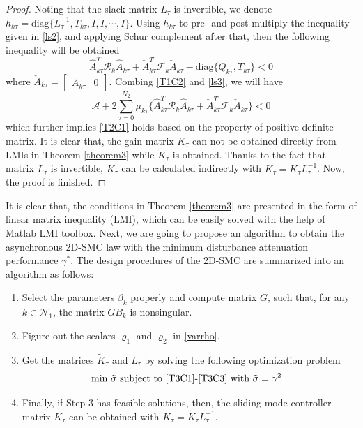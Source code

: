 \documentclass[journal,final,twocolumn]{IEEEtran}
\begin{document}
\begin{proof}
	 Noting that the slack matrix $L_{\tau }$ is invertible, we denote $h_{k\tau }= \mathrm{diag}\{L^{-1}_{\tau }, T_{k\tau }, I, I,\cdots, I \}$. Using $h_{k\tau }$ to  pre- and post-multiply the inequality given in \eqref{ls2}, and applying Schur complement after that, then the following inequality will be obtained
	 \begin{equation} \label{ls3}
	 	\hat{A}^{T}_{k\tau }\mathcal{R}_{k}\hat{A}_{k\tau } + \check{A}^{T}_{k\tau }\mathcal{F}_{k}\check{A}_{k\tau }  - \mathrm{diag}\{Q_{k\tau }, T_{k\tau }\} < 0  
	 \end{equation}
	 where $\check{A}_{k\tau }=\begin{bmatrix}
	 \bar{A}_{k\tau }&0
	 \end{bmatrix}$. Combing \eqref{T1C2} and \eqref{ls3},  we will have
	 \begin{equation}
	 	\mathcal{A} +2\sum_{\tau =0}^{N_{2}}\mu_{k\tau }\Big\{ \hat{A}^{T}_{k\tau }\mathcal{R}_{k}\hat{A}_{k\tau } + \check{A}^{T}_{k\tau }\mathcal{F}_{k}\check{A}_{k\tau } \Big\} < 0
	 \end{equation}
	 which further implies \eqref{T2C1} holds based on the property of positive definite matrix. It is clear that, the gain matrix $K_{\tau }$ can not be obtained directly from LMIs in Theorem \ref{theorem3} while $\tilde{K}_{\tau }$ is obtained. Thanks  to the fact that matrix $L_{\tau }$ is invertible, $K_{\tau }$ can be calculated indirectly with $K_{\tau }=\tilde{K}_{\tau }L^{-1}_{\tau }$. Now, the proof is finished.
\end{proof}


	It is clear that, the conditions in Theorem \ref{theorem3} are presented in the form of linear matrix inequality (LMI), which can be easily solved with the help of Matlab LMI toolbox. Next, we are going to propose an algorithm to obtain the asynchronous 2D-SMC law with the minimum disturbance attenuation performance $\gamma^{*}$. The design procedures of the 2D-SMC are summarized into an algorithm as follows:
	\begin{enumerate}
		\item Select the parameters $\beta_{k}$ properly and compute matrix $G$, such that, for any $k\in\mathcal{N}_{1}$,  the  matrix $GB_{k}$ is nonsingular.
		\item Figure out the scalars $\varrho_{1}$ and $\varrho_{2}$ in \eqref{varrho}.
		\item Get the matrices  $\tilde{K}_{\tau }$ and $L_{\tau }$ by solving the  following optimization problem
		\begin{equation}\label{optimization-problem}
		\text{min $\tilde{\sigma}$ subject to \eqref{T3C1}-\eqref{T3C3} with $\tilde\sigma=\gamma^{2}$ }.
		\end{equation}
		\item Finally, if Step 3 has feasible solutions, then, the sliding mode controller matrix $K_{\tau }$ can be obtained with $K_{\tau }= \tilde{K}_{\tau }L^{-1}_{\tau }$.
	\end{enumerate}
\end{document}
